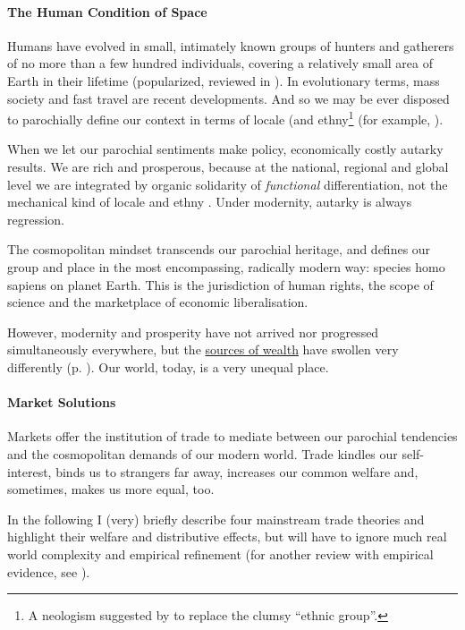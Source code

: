 \paragraph{The Human Condition of Space} Humans have evolved in small, intimately known groups of hunters and gatherers of no more than a few hundred individuals, covering a relatively small area of Earth in their lifetime (popularized, reviewed in \citealt{Diamond1997}). In evolutionary terms, mass society and fast travel are recent developments. And so we may be ever disposed to parochially define our context in terms of locale (and ethny\footnote{
	A neologism suggested by \citeauthor{Van-den-Berghe-1981-aa} to replace the clumsy ``ethnic group''.}
(for example, \citealt{Van-den-Berghe-1981-aa}).

When we let our parochial sentiments make policy, economically costly autarky results. We are rich and prosperous, because at the national, regional and global level we are integrated by organic solidarity of \emph{functional} differentiation, not the mechanical kind of locale and ethny \citep{Durkheim-1893-aa}. Under modernity, autarky is always regression.

The cosmopolitan mindset transcends our parochial heritage, and defines our group and place in the most encompassing, radically modern way: species homo sapiens on planet Earth. This is the jurisdiction of human rights, the scope of science and the marketplace of economic liberalisation.

However, modernity and prosperity have not arrived nor progressed simultaneously everywhere, but the  \hyperref[sec:sources_of_wealth]{sources of wealth} have swollen very differently (p. \pageref{sec:sources_of_wealth}). Our world, today, is a very unequal place. 

\paragraph{Market Solutions}  \label{sec:trade} Markets offer the institution of trade to mediate between our parochial tendencies and the cosmopolitan demands of our modern world. Trade kindles our self-interest, binds us to strangers far away, increases our common welfare and, sometimes, makes us more equal, too. %

In the following I (very) briefly describe four mainstream trade theories and highlight their welfare and distributive effects, but will have to ignore much real world complexity and empirical refinement (for another review with empirical evidence, see \citealt{Beckfield2009}).

